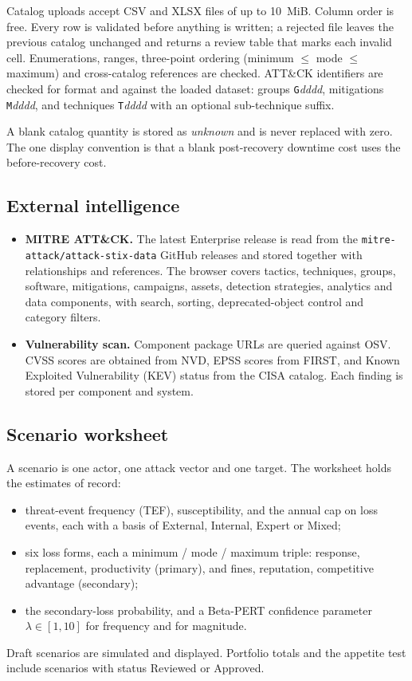 \documentclass[11pt,a4paper]{article}
\begin{document}
Catalog uploads accept CSV and XLSX files of up to 10~MiB. Column order is free. Every row is validated before anything is written; a rejected file leaves the previous catalog unchanged and returns a review table that marks each invalid cell. Enumerations, ranges, three-point ordering (minimum $\le$ mode $\le$ maximum) and cross-catalog references are checked. ATT\&CK identifiers are checked for format and against the loaded dataset: groups \texttt{G}\emph{dddd}, mitigations \texttt{M}\emph{dddd}, and techniques \texttt{T}\emph{dddd} with an optional sub-technique suffix.

A blank catalog quantity is stored as \emph{unknown} and is never replaced with zero. The one display convention is that a blank post-recovery downtime cost uses the before-recovery cost.

\subsection{External intelligence}
\begin{itemize}
  \item \textbf{MITRE ATT\&CK.} The latest Enterprise release is read from the \texttt{mitre-attack/attack-stix-data} GitHub releases and stored together with relationships and references. The browser covers tactics, techniques, groups, software, mitigations, campaigns, assets, detection strategies, analytics and data components, with search, sorting, deprecated-object control and category filters.
  \item \textbf{Vulnerability scan.} Component package URLs are queried against OSV. CVSS scores are obtained from NVD, EPSS scores from FIRST, and Known Exploited Vulnerability (KEV) status from the CISA catalog. Each finding is stored per component and system.
\end{itemize}

\subsection{Scenario worksheet}
A scenario is one actor, one attack vector and one target. The worksheet holds the estimates of record:
\begin{itemize}
  \item threat-event frequency (TEF), susceptibility, and the annual cap on loss events, each with a basis of External, Internal, Expert or Mixed;
  \item six loss forms, each a minimum / mode / maximum triple: response, replacement, productivity (primary), and fines, reputation, competitive advantage (secondary);
  \item the secondary-loss probability, and a Beta-PERT confidence parameter $\lambda\in[1,10]$ for frequency and for magnitude.
\end{itemize}
Draft scenarios are simulated and displayed. Portfolio totals and the appetite test include scenarios with status Reviewed or Approved.
\end{document}
